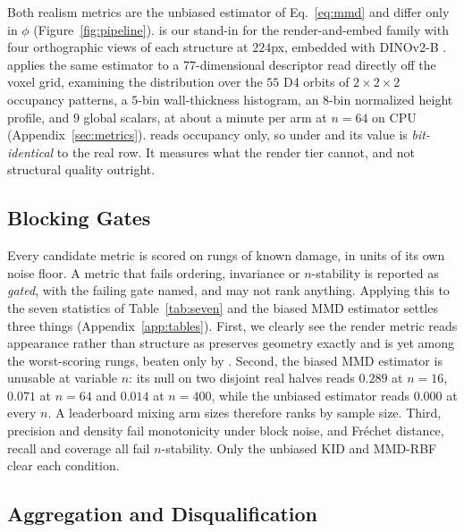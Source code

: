 Both realism metrics are the unbiased estimator of Eq.~\ref{eq:mmd} and differ only in
$\phi$ (Figure~\ref{fig:pipeline}). \textbf{\mvkid{}} is our stand-in for the render-and-embed family with four
orthographic views of each structure at $224$px, embedded with DINOv2-B
\citep{oquab2024dinov2}. \textbf{\vkid{}} applies the same estimator to a $77$-dimensional descriptor read
directly off the voxel grid, examining the distribution over the $55$ D4 orbits of
$2\times2\times2$ occupancy patterns, a $5$-bin wall-thickness histogram, an $8$-bin
normalized height profile, and $9$ global scalars, at about a minute per arm at $n{=}64$ on
CPU (Appendix~\ref{sec:metrics}).
\vkid{} reads occupancy only, so under
\matshuffle{} and \monochrome{} its value is \emph{bit-identical} to the real row. It measures what the render tier cannot, and not structural quality outright.

\subsection{Blocking Gates}
\label{sec:gates}

Every candidate metric is scored on rungs of known damage, in units of its own noise
floor. A metric that fails ordering, invariance or $n$-stability is reported as
\emph{gated}, with the failing gate named, and may not rank anything. Applying this to
the seven statistics of Table~\ref{tab:seven} and the biased MMD estimator settles three
things (Appendix~\ref{app:tables}). First, we clearly see the render metric reads appearance rather than structure as \matshuffle{} preserves
geometry exactly and is yet among the worst-scoring rungs, beaten only by \monochrome{}.
Second, the biased MMD estimator is unusable at variable $n$: its null on two disjoint
real halves reads $0.289$ at $n{=}16$, $0.071$ at $n{=}64$ and $0.014$ at $n{=}400$,
while the unbiased estimator reads $0.000$ at every $n$. A leaderboard mixing arm sizes
therefore ranks by sample size. Third, precision and density fail monotonicity under
block noise, and Fr\'echet distance, recall and coverage all fail $n$-stability. Only the
unbiased KID and MMD-RBF clear each condition.

\subsection{Aggregation and Disqualification}
\label{sec:blockscore}

